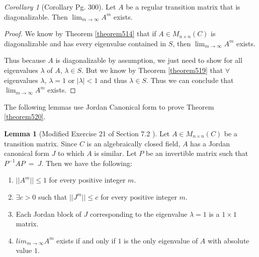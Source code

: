 \documentclass{amsart}
\theoremstyle{definition}
\newtheorem{lemma}[theorem]{Lemma}
\theoremstyle{remark}
\newtheorem{corollary}{Corollary}[theorem]
\numberwithin{equation}{section}
\begin{document}
\begin{corollary}[Corollary Pg. 300]
Let $A$ be a regular transition matrix that is diagonalizable.
Then $\lim_{m \to \infty} A^m$ exists.

\end{corollary}

\begin{proof}

We know by Theorem \ref{theorem514} that if $A \in M_{n \times n}(C)$ is diagonalizable and has every eigenvalue contained in $S$, then $\lim_{m \to \infty} A^m$ exists.


Thus because $A$ is diagonalizable by assumption, we just need to show for all eigenvalues $\lambda$ of $A$, $\lambda \in S$.
But we know by Theorem \ref{theorem519} that $\forall$ eigenvalues $\lambda$, $\lambda = 1$ or $|\lambda| < 1$ and thus $\lambda \in S$.
Thus we can conclude that $\lim_{m \to \infty} A^m$ exists.

\end{proof}



The following lemmas use Jordan Canonical form to prove Theorem \ref{theorem520}.

\begin{lemma}[Modified Exercise 21 of Section 7.2 \cite{friedberg2003linear}]
	Let $A \in M_{n \times n}(C)$ be a transition matrix.
	Since $C$ is an algebraically closed field, $A$ has a Jordan canonical form $J$ to which $A$ is similar.
	Let $P$ be an invertible matrix such that $P^{-1}AP\ =\ J$.
	Then we have the following:

	\begin{enumerate}
		\item $||A^m|| \leq 1$ for every positive integer $m$.
		\item $\exists c > 0$ such that $||J^m|| \leq c$ for every positive integer $m$.
		\item Each Jordan block of $J$ corresponding to the eigenvalue $\lambda = 1$ is a $1 \times 1$ matrix.
		\item $lim_{m \to \infty}A^m$ exists if and only if $1$ is the only eigenvalue of $A$ with absolute value $1$.

	\end{enumerate}


\end{lemma}
\end{document}
